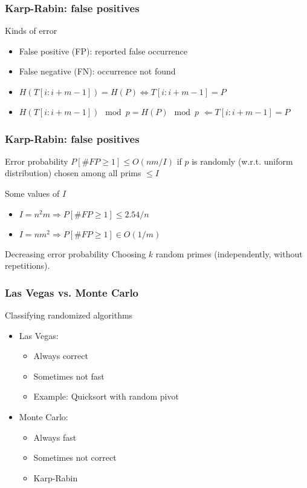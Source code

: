 \documentclass[12pt,aspectratio=169]{beamer}
\begin{document}
\begin{frame}[fragile]
\frametitle{Karp-Rabin: false positives}
\begin{block}{Kinds of error}
\begin{itemize}
\item
False positive (FP): reported false occurrence
\item
False negative (FN): occurrence not found
\item
$H(T[i:i+m-1])=H(P) \Leftrightarrow T[i:i+m-1]=P$
\item
$H(T[i:i+m-1])  \mod p = H(P)  \mod p$
$\Leftarrow T[i:i+m-1]=P$
\end{itemize}
\end{block}
\end{frame}


\begin{frame}[fragile]
\frametitle{Karp-Rabin: false positives}
\begin{block}{Error probability}
$P[\#FP\ge 1] \le O(nm/I)$ if $p$ is randomly (w.r.t. uniform distribution) chosen among
all prims $\le I$
\end{block}

\begin{block}{Some values of $I$}
\begin{itemize}
\item
$I=n^{2}m \Rightarrow P[\#FP\ge 1] \le 2.54/n$
\item
$I=nm^{2}  \Rightarrow P[\#FP\ge 1] \in O(1/m)$
\end{itemize}
\end{block}

\begin{block}{Decreasing error probability}
  Choosing $k$ random primes (independently, without repetitions).
\end{block}
\end{frame}

\begin{frame}[fragile]
\frametitle{Las Vegas vs.
  Monte Carlo}
\begin{block}{Classifying randomized algorithms}
\begin{itemize}
\item
Las Vegas:
\begin{itemize}
\item
Always correct
\item
Sometimes not fast
\item
Example: Quicksort with random pivot
\end{itemize}
\item
Monte Carlo:
\begin{itemize}
\item
Always fast
\item
Sometimes not correct
\item
Karp-Rabin
\end{itemize}
\end{itemize}
\end{block}
\end{frame}
\end{document}

